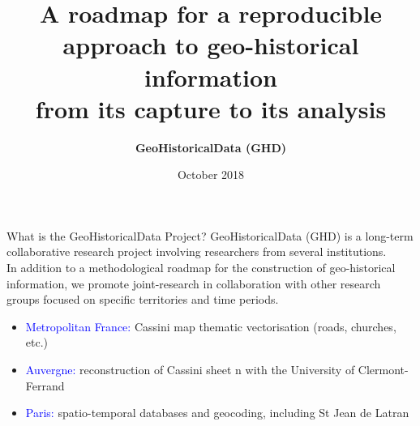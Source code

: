 \documentclass[final,hyperref={pdfpagelabels=false}]{beamer}
\title{A roadmap for a reproducible approach to geo-historical information\\from its capture to its analysis}
\author{\Large \textbf{GeoHistoricalData (GHD)}}
\institute{~}
\date{October 2018}
\let\oldcite=\cite
\renewcommand{\cite}[1]{\textcolor{ta3chameleon}{\oldcite{#1}}}
\begin{document}
\begin{frame}
\centering
  \begin{block}{What is the GeoHistoricalData Project?}
    \textcolor{ta3orange}{GeoHistoricalData} (GHD) is a long-term collaborative research project involving researchers from several institutions.\\%
    In addition to a methodological roadmap for the construction of geo-historical information, we promote joint-research in collaboration with other research groups focused on specific territories and time periods.%
    \begin{itemize}
    \item \textcolor{blue}{Metropolitan France:} \textcolor{ta3orange}{Cassini} map thematic vectorisation (roads, churches, etc.)
    \item \textcolor{blue}{Auvergne:} \textcolor{ta3orange}{reconstruction of Cassini sheet n} with the University of Clermont-Ferrand
    \item \textcolor{blue}{Paris:} spatio-temporal databases and geocoding, including \textcolor{ta3orange}{St Jean de Latran}~\cite{Rebolledo-Dhuin2014}
    \end{itemize}
  \end{block}
  \begin{columns}
\centering
    \begin{column}{0.494\textwidth}

\end{column}
\end{columns}
\end{frame}
\end{document}
